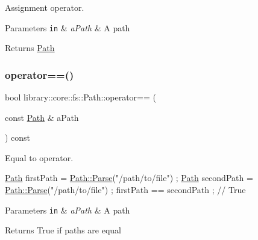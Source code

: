 Assignment operator. 


\begin{DoxyParams}[1]{Parameters}
\mbox{\tt in}  & {\em a\+Path} & A path \\
\hline
\end{DoxyParams}
\begin{DoxyReturn}{Returns}
\hyperlink{classlibrary_1_1core_1_1fs_1_1_path}{Path} 
\end{DoxyReturn}
\mbox{\label{classlibrary_1_1core_1_1fs_1_1_path_add705556eb4509ab2868e322490a1e35}} 
\subsubsection{\texorpdfstring{operator==()}{operator==()}}
{\footnotesize\ttfamily bool library\+::core\+::fs\+::\+Path\+::operator== (\begin{DoxyParamCaption}\item[{const \hyperlink{classlibrary_1_1core_1_1fs_1_1_path}{Path} \&}]{a\+Path }\end{DoxyParamCaption}) const}



Equal to operator. 


\begin{DoxyCode}
\hyperlink{classlibrary_1_1core_1_1fs_1_1_path_aaba9a8e0153813f08f78f1c3275734a4}{Path} firstPath = \hyperlink{classlibrary_1_1core_1_1fs_1_1_path_aebf5bd3af83e0b7376616e146f3e55df}{Path::Parse}(\textcolor{stringliteral}{"/path/to/file"}) ;
\hyperlink{classlibrary_1_1core_1_1fs_1_1_path_aaba9a8e0153813f08f78f1c3275734a4}{Path} secondPath = \hyperlink{classlibrary_1_1core_1_1fs_1_1_path_aebf5bd3af83e0b7376616e146f3e55df}{Path::Parse}(\textcolor{stringliteral}{"/path/to/file"}) ;
firstPath == secondPath ; \textcolor{comment}{// True}
\end{DoxyCode}



\begin{DoxyParams}[1]{Parameters}
\mbox{\tt in}  & {\em a\+Path} & A path \\
\hline
\end{DoxyParams}
\begin{DoxyReturn}{Returns}
True if paths are equal 
\end{DoxyReturn}
\mbox{\label{classlibrary_1_1core_1_1fs_1_1_path_aebf5bd3af83e0b7376616e146f3e55df}} 
